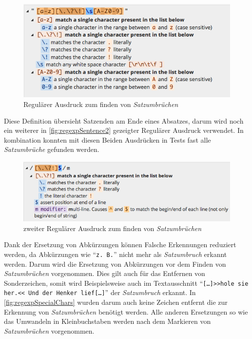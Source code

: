 		\begin{figure}[H]
        	\centering
            \includegraphics[width=0.8\linewidth]{images/regexpSentence.png}
  			\caption{Regulärer Ausdruck zum finden von \emph{Satzumbrüchen} \parencite{regex101:sentence1}}
			\label{fig:regexpSentence1}
		\end{figure}
            
		Diese Definition übersieht Satzenden am Ende eines Absatzes, darum wird noch ein weiterer in \autoref{fig:regexpSentence2} gezeigter Regulärer Ausdruck verwendet. In kombination konnten mit diesen Beiden Ausdrücken in Tests fast alle \emph{Satzumbrüche} gefunden werden.
            
        \begin{figure}[H]
			\centering
            \includegraphics[width=0.8\linewidth]{images/regexpSentence2.png}
  			\caption{zweiter Regulärer Ausdruck zum finden von \emph{Satzumbrüchen} \parencite{regex101:sentence2}}
			\label{fig:regexpSentence2}
		\end{figure}
            
        Dank der Ersetzung von Abkürzungen können Falsche Erkennungen reduziert werden, da Abkürzungen wie \enquote{\texttt{z. B.}} nicht mehr als \emph{Satzumbruch} erkannt werden. Darum wird die Ersetzung von Abkürzungen vor dem Finden von \emph{Satzumbrüchen} vorgenommen. Dies gilt auch für das Entfernen von Sonderzeichen, somit wird Beispielsweise auch im Textausschnitt \enquote{\texttt{[\dots]>>hole sie her.<< Und der Henker lief[\dots]}} der \emph{Satzumbruch} erkannt. In \autoref{fig:regexpSpecialChars} wurden darum auch keine Zeichen entfernt die zur Erkennung von \emph{Satzumbrüchen} benötigt werden. Alle anderen Ersetzungen so wie das Umwandeln in Kleinbuchstaben werden nach dem Markieren von \emph{Satzumbrüchen} vorgenommen.
